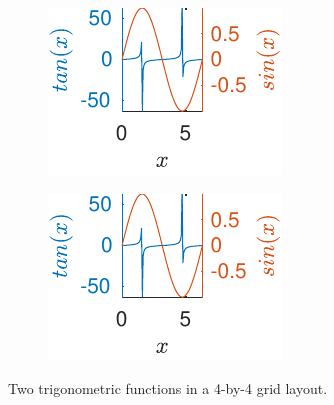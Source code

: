 \begin{figure}[H]
\begin{subfigure}[b]{\fourfig\textwidth}
			\includegraphics{../matlab/fig/examples/tansin-with-ffsp.pdf}
		\end{subfigure}
		\hfil
		\begin{subfigure}[b]{\fourfig\textwidth} 
			\includegraphics{../matlab/fig/examples/tansin-with-ffsp.pdf}
		\end{subfigure}
		\caption{Two trigonometric functions in a \num{4}-by-\num{4} grid layout. \label{fig:4-by-4}}
	\end{figure}